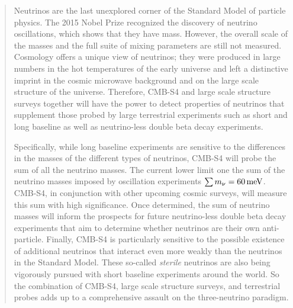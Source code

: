 \begin{quotation}

Neutrinos are the last unexplored corner of the Standard Model of particle physics.  The 2015 Nobel Prize recognized the discovery of neutrino oscillations, which shows that they have mass. However, the overall scale of the masses and the full suite of mixing parameters are still not measured.  Cosmology offers a unique view of neutrinos; they were produced in large numbers in the hot temperatures of the early universe and left a distinctive imprint in the cosmic microwave background and on the large scale structure of the universe. Therefore, CMB-S4 and large scale structure surveys together will have the power to detect properties of neutrinos that supplement those probed by large terrestrial experiments such as short and long baseline as well as neutrino-less double beta decay experiments.

Specifically, while long baseline experiments are sensitive to the differences in the masses of the different types of neutrinos, CMB-S4  will probe the sum of all the neutrino masses. The current lower limit one the sum of the neutrino masses imposed by oscillation experiments \mbox{$\sum m_\nu=60\,\rm{meV}$}. CMB-S4, in conjunction with other upcoming cosmic surveys, will measure this sum with high significance. Once determined, the sum of neutrino masses will inform the prospects for future neutrino-less double beta decay experiments that aim to determine whether neutrinos are their own anti-particle. Finally, CMB-S4 is particularly sensitive to the possible existence of additional neutrinos that interact even more weakly than the neutrinos in the Standard Model. These so-called {\it sterile} neutrinos are also being vigorously pursued with short baseline experiments around the world. So the combination of CMB-S4, large scale structure surveys, and terrestrial probes adds up to a comprehensive assault on the three-neutrino paradigm. 





\end{quotation}
